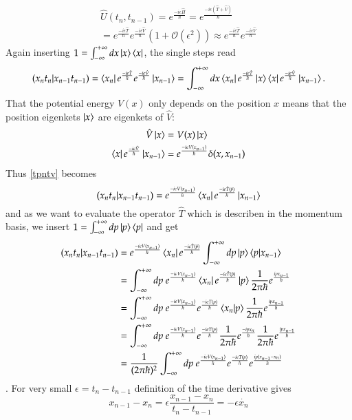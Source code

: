 \begin{align}\label{UTV}
  \hat{U}(t_{n},t_{n-1}) = e^{\frac{-i \epsilon \hat{H}}{\hbar}} = e^{\frac{-i \epsilon (\hat T + \hat V)}{\hbar}} \\
  = e^{\frac{-i \epsilon \hat{T}}{\hbar}} e^{\frac{-i \epsilon \hat{V}}{\hbar}} (1 + \mathcal{O} (\epsilon^2) ) \approx e^{\frac{-i \epsilon \hat{T}}{\hbar}} e^{\frac{-i \epsilon \hat{V}}{\hbar}} 
\end{align}
Again inserting $1 = \int_{-\infty}^{+\infty} dx \ket{x}\bra{x}$, the single steps read
\begin{equation}\label{tpntv}
  (x_n t_n | x_{n-1} t_{n-1}) = \bra{x_n} e^{\frac{-i \epsilon \hat{T}}{\hbar}} e^{\frac{-i \epsilon \hat{V}}{\hbar}}  \ket{x_{n-1}} = \int_{-\infty}^{+\infty} dx \bra{x_n} e^{\frac{-i \epsilon \hat{T}}{\hbar}} \ket{x} \bra{x} e^{\frac{-i \epsilon \hat{V}}{\hbar}}  \ket{x_{n-1}}.
\end{equation}
That the potential energy $V(x)$ only depends on the position $x$ means that the position eigenkets $\ket{x}$ are eigenkets of $\hat{V}$:
\begin{align}\label{Vx}
  \hat{V} \ket{x} &= V(x) \ket{x}  \\
  \bra{x} e^{\frac{-i \epsilon \hat{V}}{\hbar}}  \ket{x_{n-1}} &= e^{\frac{-i \epsilon V(x_{n-1})}{\hbar}} \delta (x,x_{n-1})
\end{align}
Thus \ref{tpntv} becomes
\begin{equation}\label{tpni}
   (x_n t_n | x_{n-1} t_{n-1}) = e^{\frac{-i \epsilon V(x_{n-1})}{\hbar}} \bra{x_n} e^{\frac{-i \epsilon \hat{T}(\hat{p})}{\hbar}} \ket{x_{n-1}}
\end{equation}
and as we want to evaluate the operator $\hat{T}$ which is describen in the momentum basis, we insert $1 = \int_{-\infty}^{+\infty} dp \ket{p}\bra{p}$ and get
\begin{align}\label{tpnp}
   (x_n t_n | x_{n-1} t_{n-1})  &= e^{\frac{-i \epsilon V(x_{n-1})}{\hbar}} \bra{x_n} e^{\frac{-i \epsilon \hat{T}(\hat{p})}{\hbar}} \int_{-\infty}^{+\infty} dp \ket{p}\braket{p|x_{n-1}} \\
                                &= \int_{-\infty}^{+\infty} dp \ e^{\frac{-i \epsilon V(x_{n-1})}{\hbar}} \bra{x_n} e^{\frac{-i \epsilon \hat{T}(\hat{p})}{\hbar}} \ket{p} \frac{1}{2 \pi \hbar} e^{\frac{i p x_{n-1}}{\hbar}} \\
                                &= \int_{-\infty}^{+\infty} dp \ e^{\frac{-i \epsilon V(x_{n-1})}{\hbar}} e^{\frac{-i \epsilon T(p)}{\hbar}} \braket{x_n|p} \frac{1}{2 \pi \hbar} e^{\frac{i p x_{n-1}}{\hbar}} \\
                                &= \int_{-\infty}^{+\infty} dp \ e^{\frac{-i \epsilon V(x_{n-1})}{\hbar}} e^{\frac{-i \epsilon T(p)}{\hbar}} \frac{1}{2 \pi \hbar} e^{\frac{- i p x_{n}}{\hbar}} \frac{1}{2 \pi \hbar} e^{\frac{i p x_{n-1}}{\hbar}}  \\
                                &= \frac{1}{(2 \pi \hbar)^2} \int_{-\infty}^{+\infty} dp \ e^{\frac{-i \epsilon V(x_{n-1})}{\hbar}} e^{\frac{-i \epsilon T(p)}{\hbar}} e^{\frac{i p (x_{n-1} -x_{n})}{\hbar}}
\end{align}.
For very small $\epsilon = t_n - t_{n-1}$ definition of the time derivative gives
\begin{equation}\label{deriv}
  x_{n-1} - x_{n} = \epsilon \frac{x_{n-1} -x_{n}}{t_n - t_{n-1}} = - \epsilon \dot{x_n}
\end{equation}
